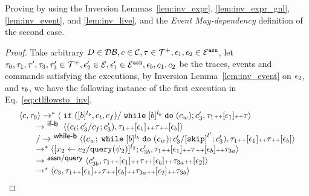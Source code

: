 	Proving by using the Inversion Lemmas~\ref{lem:inv_expr}, \ref{lem:inv_expr_gnl}, 
	\ref{lem:inv_event}, and \ref{lem:inv_live}, and the \emph{Event May-dependency} definition of the second case.
%
	\begin{proof}
		Take arbitrary $D \in \mathcal{DB} , c \in \mathcal{C}, \mathtt{\tau} \in \mathcal{T}^{+},
		\mathtt{\epsilon}_1, \mathtt{\epsilon}_2 \in \mathcal{E}^{\mathtt{{asn}}} $,
%
let $\mathtt{\tau}_0,
\mathtt{\tau}_1, \mathtt{\tau}', \mathtt{\tau}_3, \mathtt{\tau}_3' \in \mathcal{T}^{+}, 
\mathtt{\epsilon}_2' \in \mathcal{E}, \mathtt{\epsilon}_1' \in \mathcal{E}^{\mathtt{{asn}}}, \mathtt{\epsilon}_b, {c}_1, {c}_2$ be the traces, 
events and commands satisfying the executions,
by Inversion Lemma~\ref{lem:inv_event} on 
$\mathtt{\epsilon}_2$, and $\mathtt{\epsilon}_b$,
we have the following instance of the first execution in Eq.~\ref{eq:ctlflowsto_inv},
%
\begin{equation}
  \begin{array}{l}   
\config{{c}, \vtrace_0} \rightarrow^{*} 
  \config{\eif ([b]^{l_b}, c_t, c_f) / \ewhile [b]^{l_b} \edo (c_w);{c}_3', 
  \vtrace_1 \tracecat [\event_1] \tracecat \trace} 
  \\
  \qquad 
   \rightarrow^{\rname{if-b }} 
  \config{(c_t;c_3' / c_f;c_3') , 
  \trace_1 \tracecat [\event_1] \tracecat \trace \tracecat [\event_b]} 
  \\
  \qquad 
  /  \rightarrow^{\rname{while-b}} 
  \config{(c_w; \ewhile [b]^{l_b} \edo (c_w);c_3'/\clabel{\eskip}^{l'}; c_3'), 
  \trace_1 \tracecat [\event_1] \tracecat \trace \tracecat [\event_b]} 
  \\
  \qquad  \rightarrow^{*} 
  \config{[\assign{{x}_2}{\expr_2 / \query(\qexpr_2)}]^{l_2}; c_{3b}', 
  \trace_1 \tracecat [\event_1] \tracecat \trace \tracecat [\event_b] \tracecat  \trace_{3a}}
  \\ \qquad \rightarrow^{\rname{assn/query}}
  \config{ c_{3b}', 
  \trace_1 \tracecat [\event_1] \tracecat \trace \tracecat [\event_b] \tracecat  \trace_{3a} \tracecat [\event_2]}
  \\ \qquad
  \rightarrow^{*} 
  \config{c_3, 
  \trace_1 \tracecat [\event_1] \tracecat \trace \tracecat [\event_b] \tracecat  \trace_{3a} \tracecat [\event_2] \tracecat \trace_{3b}}
\end{array}
\end{equation}

\end{proof}
